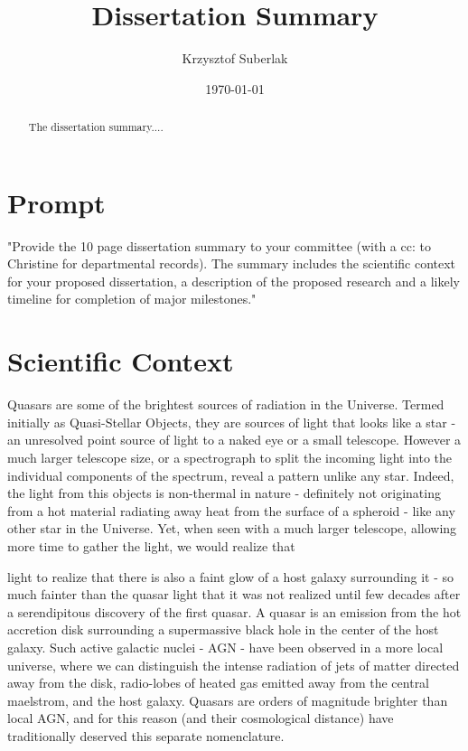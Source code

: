 \documentclass[modern]{aastex62}
\begin{document}
\title{Dissertation Summary}
\author{Krzysztof Suberlak}

\date{ \today
}

\begin{abstract}
The dissertation summary.... 
\end{abstract}

\section*{Prompt}
"Provide the 10 page dissertation summary to your committee (with a cc: to Christine for
departmental records). The summary includes the scientific context for your proposed
dissertation, a description of the proposed research and a likely timeline for completion of
major milestones."

\section{Scientific Context}

Quasars are some of the brightest sources of radiation in the Universe.  Termed initially as Quasi-Stellar Objects, they are sources of light that looks like a star - an unresolved point source of light to a naked eye or a small telescope. However a much larger telescope size, or a spectrograph to split the incoming light into the individual components of the spectrum, reveal a pattern unlike any star. Indeed, the light from this objects is non-thermal in nature - definitely not originating from a hot material radiating away heat from the surface of a spheroid - like any other star in the Universe. Yet, when seen with a much larger telescope, allowing more time to gather the light, we would realize that 

light to realize that there is also a faint glow of a host galaxy  surrounding it - so much fainter than the quasar light that it was not realized until few decades after a serendipitous discovery of the first quasar. A quasar is an emission from the hot accretion disk surrounding a supermassive black hole in the center of the host galaxy.  Such active galactic nuclei - AGN - have been observed in a more local universe, where we can distinguish the intense radiation of  jets of matter directed away from the disk, radio-lobes of heated gas emitted away from the central maelstrom, and the host galaxy. Quasars are orders of magnitude brighter than local AGN, and for this reason (and their cosmological distance) have traditionally deserved this separate nomenclature.
\end{document}
